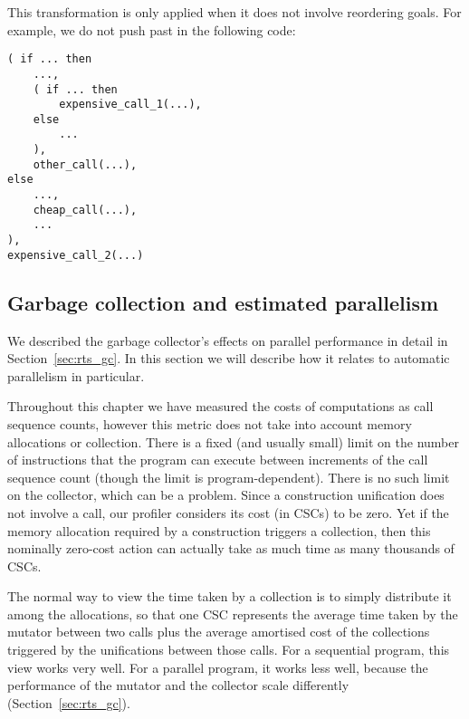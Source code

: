 This transformation is only applied when it does not involve reordering goals.
For example, we do not push  past
 in the following code:

\begin{verbatim}
( if ... then
    ...,
    ( if ... then
        expensive_call_1(...),
    else
        ...
    ),
    other_call(...),
else
    ...,
    cheap_call(...),
    ...
),
expensive_call_2(...)
\end{verbatim}

\subsection{Garbage collection and estimated parallelism}
\label{sec:overlap_pragma_gc}

We described the garbage collector's effects on parallel performance in
detail in Section~\ref{sec:rts_gc}.
In this section we will describe how it relates to automatic parallelism in
particular.

Throughout this chapter we have measured the costs of computations as call
sequence counts,
however this metric does not take into account memory allocations or
collection.
There is a fixed (and usually small) limit
on the number of instructions that the program can execute
between increments of the call sequence count
(though the limit is program-dependent).
There is no such limit on the collector, which can be a problem.
Since a construction unification does not involve a call,
our profiler considers its cost (in CSCs) to be zero.
Yet if the memory allocation required by a construction
triggers a collection,
then this nominally zero-cost action can actually take as much time
as many thousands of CSCs.

The normal way to view the time taken by a collection
is to simply distribute it among the allocations,
so that one CSC represents the average time taken
by the mutator between two calls
plus the average amortised cost of the collections
triggered by the unifications between those calls.
For a sequential program, this view works very well.
For a parallel program, it works less well,
because the performance of the mutator and the collector scale differently
(Section~\ref{sec:rts_gc}).


